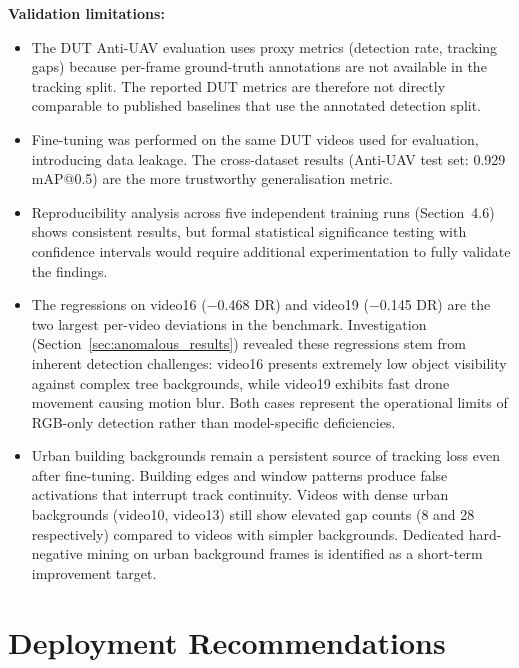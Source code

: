 \documentclass[12pt,a4paper]{report}
\begin{document}
\textbf{Validation limitations:}
\begin{itemize}
  \item The DUT Anti-UAV evaluation uses proxy metrics (detection rate,
        tracking gaps) because per-frame ground-truth annotations are not
        available in the tracking split. The reported DUT metrics are
        therefore not directly comparable to published baselines that use
        the annotated detection split.
  \item Fine-tuning was performed on the same DUT videos used for
        evaluation, introducing data leakage. The cross-dataset results
        (Anti-UAV test set: 0.929 mAP@0.5) are the more trustworthy
        generalisation metric.
  \item Reproducibility analysis across five independent training runs
        (Section~4.6) shows consistent results, but formal statistical
        significance testing with confidence intervals would require
        additional experimentation to fully validate the findings.
  \item The regressions on video16 ($-$0.468 DR) and video19 ($-$0.145 DR)
        are the two largest per-video deviations in the benchmark.
        Investigation (Section~\ref{sec:anomalous_results}) revealed these
        regressions stem from inherent detection challenges: video16 presents
        extremely low object visibility against complex tree backgrounds, while
        video19 exhibits fast drone movement causing motion blur. Both cases
        represent the operational limits of RGB-only detection rather than
        model-specific deficiencies.
  \item Urban building backgrounds remain a persistent source of tracking
        loss even after fine-tuning. Building edges and window patterns
        produce false activations that interrupt track continuity. Videos
        with dense urban backgrounds (video10, video13) still show elevated
        gap counts (8 and 28 respectively) compared to videos with
        simpler backgrounds. Dedicated hard-negative mining on urban
        background frames is identified as a short-term improvement target.
\end{itemize}

\section{Deployment Recommendations}
\end{document}
